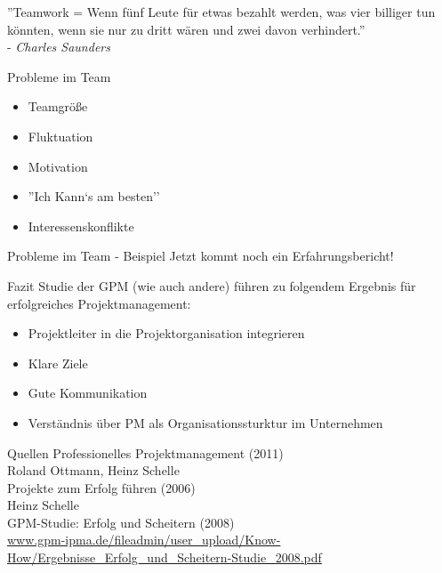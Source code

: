 \documentclass[12pt]{beamer}
\begin{document}
	\thispagestyle{empty}
	\begin{frame}
		''Teamwork = Wenn fünf Leute für etwas bezahlt werden, was vier billiger tun könnten, wenn sie nur zu dritt wären und zwei davon verhindert.''\\
- \textit{Charles Saunders}
	\end{frame}

	\begin{frame}{Probleme im Team}
		\begin{itemize}
			\item{Teamgröße}
			\item{Fluktuation}
			\item{Motivation}
			\item{''Ich Kann`s am besten''}
			\item{Interessenskonflikte}
		\end{itemize}
	\end{frame}

	\begin{frame}{Probleme im Team - Beispiel}
		Jetzt kommt noch ein Erfahrungsbericht!	
	\end{frame}

	\begin{frame}{Fazit}
		Studie der GPM (wie auch andere) führen zu folgendem Ergebnis für erfolgreiches Projektmanagement:
		\begin{itemize}
			\item{Projektleiter in die Projektorganisation integrieren}
			\item{Klare Ziele}
			\item{Gute Kommunikation}
			\item{Verständnis über PM als Organisationssturktur im Unternehmen}
		\end{itemize}
	\end{frame}
	
	\begin{frame}{Quellen}
		Professionelles Projektmanagement (2011)\\
		Roland Ottmann, Heinz Schelle\\ 
		Projekte zum Erfolg führen (2006)\\
		Heinz Schelle \\
		GPM-Studie: Erfolg und Scheitern (2008)\\
		\url{www.gpm-ipma.de/fileadmin/user_upload/Know-How/Ergebnisse_Erfolg_und_Scheitern-Studie_2008.pdf}
		
	\end{frame}
	
\end{document}

